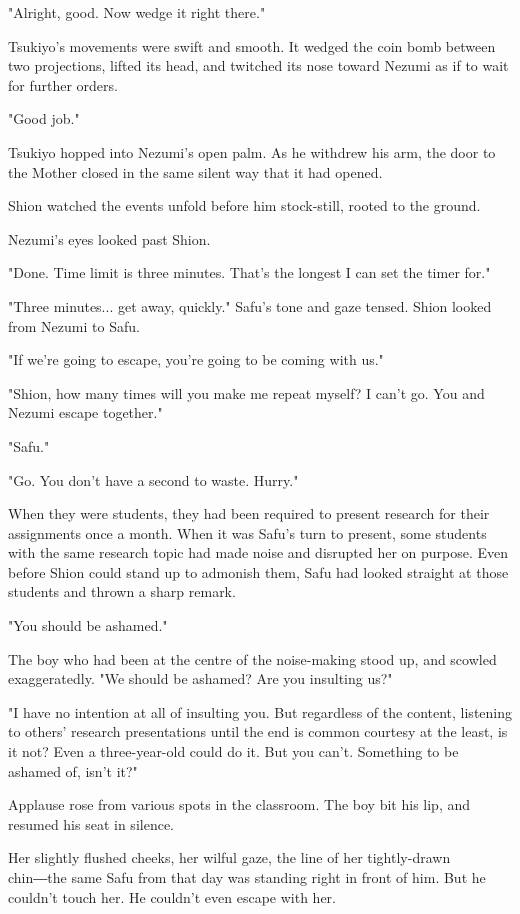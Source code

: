 "Alright, good. Now wedge it right there."

Tsukiyo's movements were swift and smooth. It wedged the coin bomb
between two projections, lifted its head, and twitched its nose toward
Nezumi as if to wait for further orders.

"Good job."

Tsukiyo hopped into Nezumi's open palm. As he withdrew his arm, the door
to the Mother closed in the same silent way that it had opened.

Shion watched the events unfold before him stock-still, rooted to the
ground.

Nezumi's eyes looked past Shion.

"Done. Time limit is three minutes. That's the longest I can set the
timer for."

"Three minutes... get away, quickly." Safu's tone and gaze tensed. Shion
looked from Nezumi to Safu.

"If we're going to escape, you're going to be coming with us."

"Shion, how many times will you make me repeat myself? I can't go. You
and Nezumi escape together."

"Safu."

"Go. You don't have a second to waste. Hurry."

When they were students, they had been required to present research for
their assignments once a month. When it was Safu's turn to present, some
students with the same research topic had made noise and disrupted her
on purpose. Even before Shion could stand up to admonish them, Safu had
looked straight at those students and thrown a sharp remark.

"You should be ashamed."

The boy who had been at the centre of the noise-making stood up, and
scowled exaggeratedly. "We should be ashamed? Are you insulting us?"

"I have no intention at all of insulting you. But regardless of the
content, listening to others' research presentations until the end is
common courtesy at the least, is it not? Even a three-year-old could do
it. But you can't. Something to be ashamed of, isn't it?"

Applause rose from various spots in the classroom. The boy bit his lip,
and resumed his seat in silence.

Her slightly flushed cheeks, her wilful gaze, the line of her
tightly-drawn chin―the same Safu from that day was standing right in
front of him. But he couldn't touch her. He couldn't even escape with
her.

